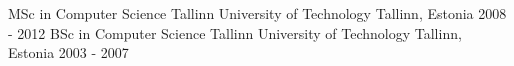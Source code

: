 \begin{cventries}
  \cventry
    {MSc in Computer Science}
    {Tallinn University of Technology}
    {Tallinn, Estonia}
    {2008 - 2012}
    {
    }
  \cventry
    {BSc in Computer Science}
    {Tallinn University of Technology}
    {Tallinn, Estonia}
    {2003 - 2007}
    {
    }
\end{cventries}
